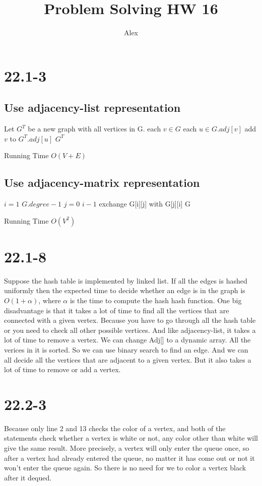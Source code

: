 \documentclass[a4paper]{article}
\author{Alex}
\title{Problem Solving HW 16}
\begin{document}
\maketitle
\section*{22.1-3}
\subsection*{Use adjacency-list representation}
\begin{codebox}
\li Let $G^T$ be a new graph with all vertices in G.
\li \For each $v \in G$ 
\li 	\Do \For each $u \in G.adj[v]$
\li		\Do add $v$ to $G^T.adj[u]$
		\End
	\End 
\li \Return $G^T$
\end{codebox}
Running Time $O(V+E)$
\subsection* {Use adjacency-matrix representation}
\begin{codebox}
\li \For $i = 1$  \To $G.degree - 1$
\Do
\li \For $j = 0$ \To $i - 1$
\Do
\li exchange G[i][j] with G[j][i]
\End 
\End
\li \Return G
\end{codebox}
Running Time $O(V^2)$
\section*{22.1-8}
Suppose the hash table is implemented by linked list. If all the edges is hashed uniformly
then the expected time to decide whether an edge is in the graph is $O(1+\alpha)$, where $\alpha$ is the time to compute the hash hash function.
One big disadvantage is that it takes a lot of time to find all the vertices that are connected with a given vertex. Because you have to go through all the hash table or you need to check all other possible vertices. And like
adjacency-list, it takes a lot of time to remove a vertex. We can change Adj[] to a dynamic array. All the verices in it is sorted. So we can use binary search to find an edge. And we can all decide all the vertices that are adjacent to a given vertex. But
it also takes a lot of time to remove or add a vertex. 
\section*{22.2-3}
Because only line 2 and 13 checks the color of a vertex, and both of the statements check whether a vertex is white or not, any color other than white will give the same result. More precisely, a vertex will only enter the queue once, so after a vertex had already entered the queue, no matter it has come out or not it won't enter the queue again. So there is no need for we to color a vertex black after it dequed.
\end{document}
